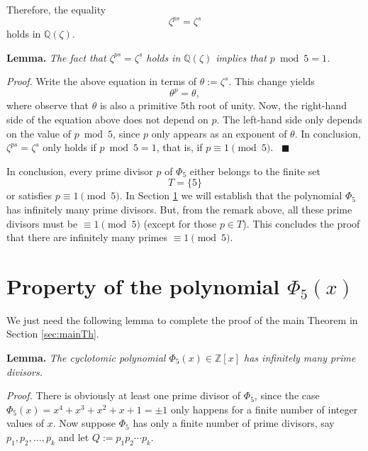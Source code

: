\documentclass[a4paper, 12pt]{article}
\theoremstyle{definition}
\newcommand{\Z}{\mathbb{Z}}
\newcommand{\Q}{\mathbb{Q}}
\begin{document}
Therefore, the equality
\begin{equation}\label{eq:equality_in_zeta}
\zeta^{ps}=\zeta^{s}
\end{equation}
holds in $\Q(\zeta)$. 

\textbf{Lemma.} \emph{The fact that $\zeta^{ps}=\zeta^{s}$ holds in $\Q(\zeta)$ implies that $p \bmod{5}=1$.}

\textit{Proof.} Write the above equation in terms of $\theta:=\zeta^{s}$. This change yields
\begin{equation*}
\theta^{p}=\theta,
\end{equation*}
where observe that $\theta$ is also a primitive $5$th root of unity. Now, the right-hand side of the equation above does not depend on $p$. The left-hand side only depends on the value of $p\bmod{5}$, since $p$ only appears as an exponent of $\theta$. In conclusion, $\zeta^{ps}=\zeta^{s}$ only holds if $p \bmod{5}=1$, that is, if $p\equiv 1\pmod{5}$. \ $\blacksquare$

In conclusion, every prime divisor $p$ of $\Phi_{5}$ either belongs to the finite set 
\begin{equation*}
T=\{5\}
\end{equation*}
or satisfies $p\equiv 1 \pmod{5}$. In Section \ref{sec:properties} we will establish that the polynomial $\Phi_{5}$ has infinitely many prime divisors. But, from the remark above, all these prime divisors must be $\equiv 1\pmod{5}$ (except for those $p\in T$). This concludes the proof that there are infinitely many primes $\equiv 1 \pmod{5}$.

\section{Property of the polynomial \texorpdfstring{$\Phi_{5}(x)$}{Pkx}}\label{sec:properties}

We just need the following lemma to complete the proof of the main Theorem in Section \ref{sec:mainTh}.

\textbf{Lemma.} \emph{The cyclotomic polynomial $\Phi_{5}(x)\in\Z[x]$ has infinitely many prime divisors.}

\textit{Proof.} There is obviously at least one prime divisor of $\Phi_{5}$, since the case $\Phi_{5}(x)=x^{4} + x^{3} + x^{2} + x + 1=\pm 1$ only happens for a finite number of integer values of $x$. Now suppose $\Phi_{5}$ has only a finite number of prime divisors, say $p_1, p_2,\dots,p_k$ and let $Q:=p_1p_2\cdots p_k$. 
\end{document}
